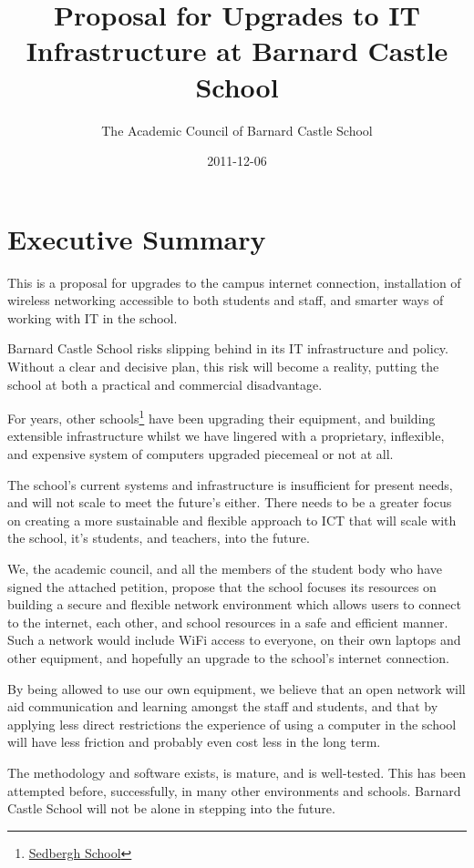 \documentclass[a4paper,leqno,titlepage]{article}
\title{Proposal for Upgrades to IT Infrastructure at Barnard Castle School}
\author{The Academic Council of Barnard Castle School}
\date{2011-12-06}
\begin{document}
\maketitle

\section{Executive Summary}

This is a proposal for upgrades to the campus internet connection,
installation of wireless networking accessible to both students and staff,
and smarter ways of working with IT in the school. 

Barnard Castle School risks slipping behind in its
IT infrastructure and policy.
Without a clear and decisive plan, this risk will become a reality, putting
the school at both a practical and commercial disadvantage.


For years, other schools\footnote{\href{http://www.sedberghschool.org/ict.html}{Sedbergh School}} 
have been upgrading their equipment, and building extensible infrastructure
whilst we have lingered with a proprietary, inflexible, and expensive system of
computers upgraded piecemeal or not at all.


The school's current systems and infrastructure is insufficient for present
needs, and will not scale to meet the future's either.
There needs to be a greater focus on creating a more sustainable and flexible
approach to ICT that will scale with the school, it's students, and teachers,
into the future.


We, the academic council, and all the members of the student body who have signed
the attached petition, propose that the school focuses its resources on building
a secure and flexible network environment which allows users to connect to the
internet, each other, and school resources in a safe and efficient manner.
Such a network would include WiFi access to everyone, on their own laptops and
other equipment, and hopefully an upgrade to the school's internet connection.


By being allowed to use our own equipment, we believe that an open network will
aid communication and learning amongst the staff and students, and that by
applying less direct restrictions the experience of using a computer in the
school will have less friction and probably even cost less in the long term.


The methodology and software exists, is mature, and is well-tested. This has been
attempted before, successfully, in many other environments and schools.
Barnard Castle School will not be alone in stepping into the future.
\end{document}
